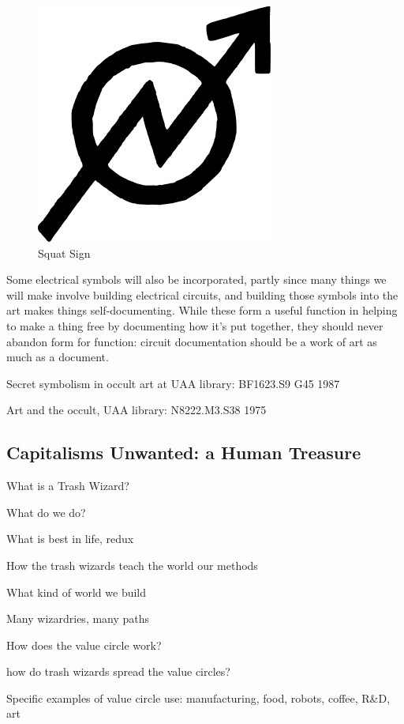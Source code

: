 \begin{figure}[htbp]
\centering
\includegraphics{images/squat.png}
\caption{Squat Sign}
\end{figure}

Some electrical symbols will also be incorporated, partly since many
things we will make involve building electrical circuits, and building
those symbols into the art makes things self-documenting. While these
form a useful function in helping to make a thing free by documenting
how it's put together, they should never abandon form for function:
circuit documentation should be a work of art as much as a document.

Secret symbolism in occult art at UAA library: BF1623.S9 G45 1987

Art and the occult, UAA library: N8222.M3.S38 1975

\subsection{Capitalisms Unwanted: a Human
Treasure}\label{capitalisms-unwanted-a-human-treasure}

What is a Trash Wizard?

What do we do?

What is best in life, redux

How the trash wizards teach the world our methods

What kind of world we build

Many wizardries, many paths

How does the value circle work?

how do trash wizards spread the value circles?

Specific examples of value circle use: manufacturing, food, robots,
coffee, R\&D, art


